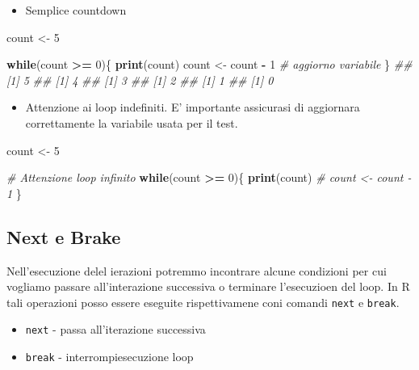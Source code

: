 \documentclass[
]{book}
\newenvironment{Shaded}{\begin{snugshade}}{\end{snugshade}}
\newcommand{\CommentTok}[1]{\textcolor[rgb]{0.56,0.35,0.01}{\textit{#1}}}
\newcommand{\ControlFlowTok}[1]{\textcolor[rgb]{0.13,0.29,0.53}{\textbf{#1}}}
\newcommand{\DecValTok}[1]{\textcolor[rgb]{0.00,0.00,0.81}{#1}}
\newcommand{\KeywordTok}[1]{\textcolor[rgb]{0.13,0.29,0.53}{\textbf{#1}}}
\newcommand{\NormalTok}[1]{#1}
\newcommand{\OperatorTok}[1]{\textcolor[rgb]{0.81,0.36,0.00}{\textbf{#1}}}
\newcommand{\StringTok}[1]{\textcolor[rgb]{0.31,0.60,0.02}{#1}}
\providecommand{\tightlist}{%
  \setlength{\itemsep}{0pt}\setlength{\parskip}{0pt}}
\begin{document}
\begin{itemize}
\tightlist
\item
  Semplice countdown
\end{itemize}

\begin{Shaded}
\begin{Highlighting}[]
\NormalTok{count <-}\StringTok{ }\DecValTok{5}

\ControlFlowTok{while}\NormalTok{(count }\OperatorTok{>=}\StringTok{ }\DecValTok{0}\NormalTok{)\{}
  \KeywordTok{print}\NormalTok{(count)}
\NormalTok{  count <-}\StringTok{ }\NormalTok{count }\OperatorTok{-}\StringTok{ }\DecValTok{1} \CommentTok{# aggiorno variabile}
\NormalTok{\}}
\CommentTok{## [1] 5}
\CommentTok{## [1] 4}
\CommentTok{## [1] 3}
\CommentTok{## [1] 2}
\CommentTok{## [1] 1}
\CommentTok{## [1] 0}
\end{Highlighting}
\end{Shaded}

\begin{itemize}
\tightlist
\item
  Attenzione ai loop indefiniti. E' importante assicurasi di aggiornara correttamente la variabile usata per il test.
\end{itemize}

\begin{Shaded}
\begin{Highlighting}[]
\NormalTok{count <-}\StringTok{ }\DecValTok{5}

\CommentTok{# Attenzione loop infinito}
\ControlFlowTok{while}\NormalTok{(count }\OperatorTok{>=}\StringTok{ }\DecValTok{0}\NormalTok{)\{}
  \KeywordTok{print}\NormalTok{(count)}
  \CommentTok{# count <- count - 1 }
\NormalTok{\}}
\end{Highlighting}
\end{Shaded}

\hypertarget{next-e-brake}{%
\subsection{Next e Brake}\label{next-e-brake}}

Nell'esecuzione delel ierazioni potremmo incontrare alcune condizioni per cui vogliamo passare all'interazione successiva o terminare l'esecuzioen del loop. In R tali operazioni posso essere eseguite rispettivamene coni comandi \texttt{next} e \texttt{break}.

\begin{itemize}
\tightlist
\item
  \texttt{next} - passa all'iterazione successiva
\item
  \texttt{break} - interrompiesecuzione loop
\end{itemize}
\end{document}
